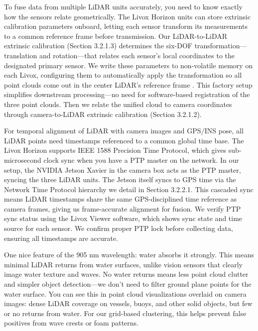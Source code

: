 \documentclass{erauthesis}
\begin{document}
To fuse data from multiple \ac{LiDAR} units accurately, you need to know exactly how the sensors relate geometrically.
The Livox Horizon units can store extrinsic calibration parameters onboard, letting each sensor transform its measurements to a common reference frame before transmission.
Our \ac{LiDAR}-to-\ac{LiDAR} extrinsic calibration (Section 3.2.1.3) determines the six-DOF transformation—translation and rotation—that relates each sensor's local coordinates to the designated primary sensor.
We write these parameters to non-volatile memory on each Livox, configuring them to automatically apply the transformation so all point clouds come out in the center \ac{LiDAR}'s reference frame \cite{thompson2023}.
This factory setup simplifies downstream processing—no need for software-based registration of the three point clouds.
Then we relate the unified cloud to camera coordinates through camera-to-\ac{LiDAR} extrinsic calibration (Section 3.2.1.2).

For temporal alignment of \ac{LiDAR} with camera images and \ac{GPS}/\ac{INS} pose, all \ac{LiDAR} points need timestamps referenced to a common global time base.
The Livox Horizon supports IEEE 1588 Precision Time Protocol, which gives sub-microsecond clock sync when you have a PTP master on the network.
In our setup, the NVIDIA Jetson Xavier in the camera box acts as the PTP master, syncing the three \ac{LiDAR} units.
The Jetson itself syncs to \ac{GPS} time via the Network Time Protocol hierarchy we detail in Section 3.2.2.1.
This cascaded sync means \ac{LiDAR} timestamps share the same \ac{GPS}-disciplined time reference as camera frames, giving us frame-accurate alignment for fusion.
We verify PTP sync status using the Livox Viewer software, which shows sync state and time source for each sensor.
We confirm proper PTP lock before collecting data, ensuring all timestamps are accurate.

One nice feature of the 905 nm wavelength: water absorbs it strongly.
This means minimal \ac{LiDAR} returns from water surfaces, unlike vision sensors that clearly image water texture and waves.
No water returns means less point cloud clutter and simpler object detection—we don't need to filter ground plane points for the water surface.
You can see this in point cloud visualizations overlaid on camera images: dense \ac{LiDAR} coverage on vessels, buoys, and other solid objects, but few or no returns from water.
For our grid-based clustering, this helps prevent false positives from wave crests or foam patterns.
\end{document}
